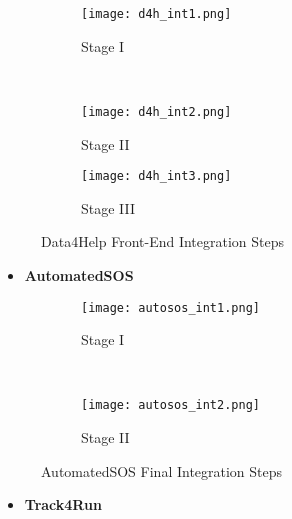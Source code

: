 \FloatBarrier	
\begin{figure*}[ht!]	
	\centering	
	\begin{subfigure}[t]{0.5\textwidth}	
		\centering	
		\texttt{[image: d4h\_int1.png]}	
		\caption{Stage I}	
	\end{subfigure}%
	~ \vspace{20px}	
	\begin{subfigure}[t]{0.5\textwidth}	
		\centering	
		\texttt{[image: d4h\_int2.png]}	
		\caption{Stage II}	
	\end{subfigure}	
	\begin{subfigure}[t]{0.5\textwidth}	
		\centering	
		\texttt{[image: d4h\_int3.png]}	
		\caption{Stage III}	
	\end{subfigure}	
	
	\caption{Data4Help Front-End Integration Steps}	
\end{figure*}	

\FloatBarrier
	
\begin{itemize}
	\item \textbf{AutomatedSOS}
\end{itemize}


\FloatBarrier
\begin{figure*}[ht!]	
	\centering	
	\begin{subfigure}[t]{0.5\textwidth}	
		\centering	
		\texttt{[image: autosos\_int1.png]}	
		\caption{Stage I}	
	\end{subfigure}%
	~ \vspace{20px}	
	\begin{subfigure}[t]{0.5\textwidth}	
		\centering	
		\texttt{[image: autosos\_int2.png]}	
		\caption{Stage II}	
	\end{subfigure}	
	\caption{AutomatedSOS Final Integration Steps}	
\end{figure*}	

\FloatBarrier

\begin{itemize}
	\item \textbf{Track4Run}
\end{itemize}


